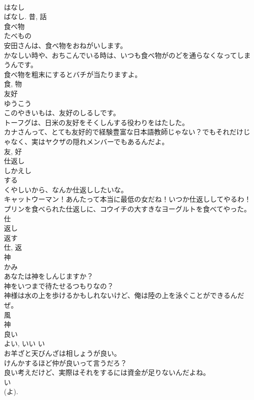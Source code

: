 \documentclass[8pt]{extreport}
\begin{document}
\begin{CJK}{UTF8}{min}
\\	はなし 
\\	ばなし.	昔, 話	
\\	食べ物	
\\	たべもの	
\\	安田さんは、食べ物をおねがいします。	
\\	かなしい時や、おちこんでいる時は、いつも食べ物がのどを通らなくなってしまうんです。	
\\	食べ物を粗末にするとバチが当たりますよ。	
\\	食, 物	
\\	友好	
\\	ゆうこう	
\\	このやきいもは、友好のしるしです。	
\\	トーフグは、日米の友好をそくしんする役わりをはたした。	
\\	カナさんって、とても友好的で経験豊富な日本語教師じゃない？でもそれだけじゃなく、実はヤクザの隠れメンバーでもあるんだよ。	
\\	友, 好	
\\	仕返し	
\\	しかえし	
\\	する 
\\	くやしいから、なんか仕返ししたいな。	
\\	キャットウーマン！あんたって本当に最低の女だね！いつか仕返ししてやるわ！	
\\	プリンを食べられた仕返しに、コウイチの大すきなヨーグルトを食べてやった。	
\\	仕 
\\	返し 
\\	返す 
\\	仕, 返	
\\	神	
\\	かみ	
\\	あなたは神をしんじますか？	
\\	神をいつまで待たせるつもりなの？	
\\	神様は水の上を歩けるかもしれないけど、俺は陸の上を泳ぐことができるんだぜ。	
\\	風 
\\	神	
\\	良い	
\\	よい, いい	い 
\\	お羊ざと天びんざは相しょうが良い。	
\\	けんかするほど仲が良いって言うだろ？	
\\	良い考えだけど、実際はそれをするには資金が足りないんだよね。	
\\	い 
\\	(よ). 

\end{CJK}
\end{document}
